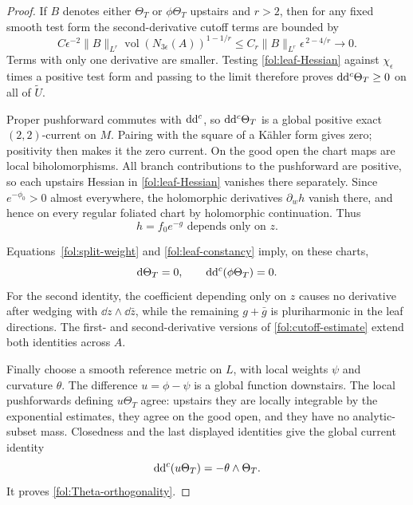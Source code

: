 \begin{proof}
If $B$ denotes either $\Theta_T$ or $\phi\Theta_T$ upstairs and
$r>2$, then for any fixed smooth test form the second-derivative
cutoff terms are bounded by
\begin{equation}\label{fol:cutoff-estimate}
 C\epsilon^{-2}\|B\|_{L^r}
       \operatorname{vol}(N_{3\epsilon}(A))^{1-1/r}
 \leq C_r\|B\|_{L^r}\epsilon^{\,2-4/r}
 \longrightarrow0.
\end{equation}
Terms with only one derivative are smaller.  Testing
\eqref{fol:leaf-Hessian} against $\chi_\epsilon$ times a positive
test form and passing to the limit therefore proves
$\mathrm{d}\mathrm{d}^{c}\Theta_T\geq0$ on all of $\widetilde U$.

Proper pushforward commutes with $\mathrm{d}\mathrm{d}^{c}$, so $\mathrm{d}\mathrm{d}^{c}\Theta_T$ is a
global positive exact $(2,2)$-current on $M$.  Pairing with the square
of a K\"ahler form gives zero; positivity then makes it the zero
current.  On the good open the chart maps are local biholomorphisms.
All branch contributions to the pushforward are positive, so each
upstairs Hessian in \eqref{fol:leaf-Hessian} vanishes there separately.
Since $e^{-\phi_0}>0$ almost everywhere, the holomorphic derivatives
$\partial_w h$ vanish there, and hence on every regular foliated chart
by holomorphic continuation.  Thus
\begin{equation}\label{fol:leaf-constancy}
 h=f_0e^{-g}\text{ depends only on }z.
\end{equation}

Equations~\eqref{fol:split-weight} and \eqref{fol:leaf-constancy} imply,
on these charts,
\[
 \mathrm{d}\Theta_T=0,\qquad \mathrm{d}\mathrm{d}^{c}(\phi\Theta_T)=0.
\]
For the second identity, the coefficient depending only on $z$ causes
no derivative after wedging with $\dd z\wedge\dd\bar z$, while the
remaining $g+\bar g$ is pluriharmonic in the leaf directions.
The first- and second-derivative versions of
\eqref{fol:cutoff-estimate} extend both identities across $A$.

Finally choose a smooth reference metric on $L$, with local weights
$\psi$ and curvature $\theta$.  The difference $u=\phi-\psi$ is a
global function downstairs.  The local pushforwards defining
$u\Theta_T$ agree: upstairs they are locally integrable by the
exponential estimates, they agree on the good open, and they have
no analytic-subset mass.  Closedness and the last displayed identities
give the global current identity
\begin{equation}\label{fol:potential-identity}
 \mathrm{d}\mathrm{d}^{c}(u\Theta_T)=-\theta\wedge\Theta_T.
\end{equation}
It proves \eqref{fol:Theta-orthogonality}.
\end{proof}


